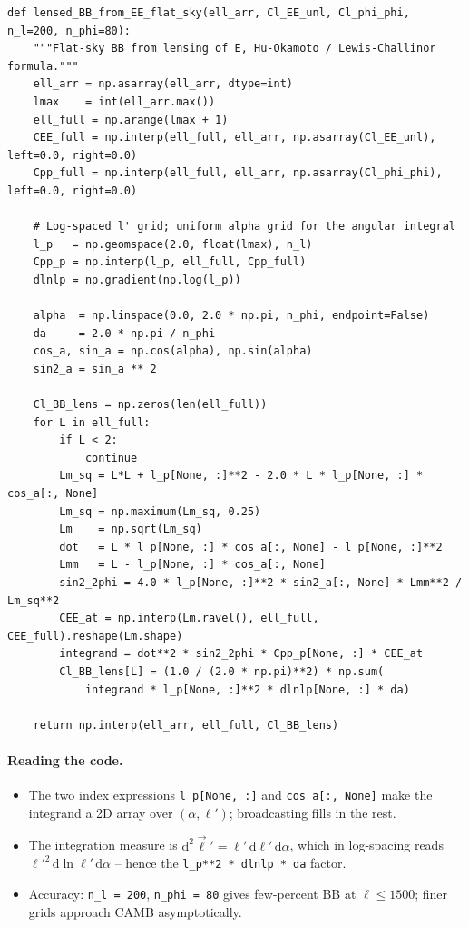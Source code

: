 \begin{codebox}
\begin{lstlisting}[style=python]
def lensed_BB_from_EE_flat_sky(ell_arr, Cl_EE_unl, Cl_phi_phi, n_l=200, n_phi=80):
    """Flat-sky BB from lensing of E, Hu-Okamoto / Lewis-Challinor formula."""
    ell_arr = np.asarray(ell_arr, dtype=int)
    lmax    = int(ell_arr.max())
    ell_full = np.arange(lmax + 1)
    CEE_full = np.interp(ell_full, ell_arr, np.asarray(Cl_EE_unl), left=0.0, right=0.0)
    Cpp_full = np.interp(ell_full, ell_arr, np.asarray(Cl_phi_phi), left=0.0, right=0.0)

    # Log-spaced l' grid; uniform alpha grid for the angular integral
    l_p   = np.geomspace(2.0, float(lmax), n_l)
    Cpp_p = np.interp(l_p, ell_full, Cpp_full)
    dlnlp = np.gradient(np.log(l_p))

    alpha  = np.linspace(0.0, 2.0 * np.pi, n_phi, endpoint=False)
    da     = 2.0 * np.pi / n_phi
    cos_a, sin_a = np.cos(alpha), np.sin(alpha)
    sin2_a = sin_a ** 2

    Cl_BB_lens = np.zeros(len(ell_full))
    for L in ell_full:
        if L < 2:
            continue
        Lm_sq = L*L + l_p[None, :]**2 - 2.0 * L * l_p[None, :] * cos_a[:, None]
        Lm_sq = np.maximum(Lm_sq, 0.25)
        Lm    = np.sqrt(Lm_sq)
        dot   = L * l_p[None, :] * cos_a[:, None] - l_p[None, :]**2
        Lmm   = L - l_p[None, :] * cos_a[:, None]
        sin2_2phi = 4.0 * l_p[None, :]**2 * sin2_a[:, None] * Lmm**2 / Lm_sq**2
        CEE_at = np.interp(Lm.ravel(), ell_full, CEE_full).reshape(Lm.shape)
        integrand = dot**2 * sin2_2phi * Cpp_p[None, :] * CEE_at
        Cl_BB_lens[L] = (1.0 / (2.0 * np.pi)**2) * np.sum(
            integrand * l_p[None, :]**2 * dlnlp[None, :] * da)

    return np.interp(ell_arr, ell_full, Cl_BB_lens)
\end{lstlisting}
\end{codebox}

\paragraph{Reading the code.}
\begin{itemize}
  \item The two index expressions \texttt{l\_p[None, :]} and \texttt{cos\_a[:, None]} make the integrand a 2D array over $(\alpha, \ell')$; broadcasting fills in the rest.
  \item The integration measure is $\mathrm{d}^2\vec\ell' = \ell'\,\mathrm{d}\ell'\,\mathrm{d}\alpha$, which in log-spacing reads $\ell'^2\,\mathrm{d}\ln\ell'\,\mathrm{d}\alpha$ -- hence the \texttt{l\_p**2 * dlnlp * da} factor.
  \item Accuracy: \texttt{n\_l = 200}, \texttt{n\_phi = 80} gives few-percent BB at $\ell \leq 1500$; finer grids approach CAMB asymptotically.
\end{itemize}

